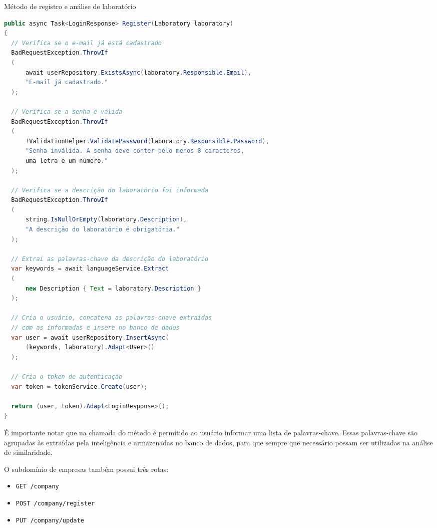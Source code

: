 \begin{sourcecode}[H]
  \caption{\label{codigo:analyze-lab}Método de registro e análise de laboratório}
  \begin{lstlisting}[frame=single, language=Java]
public async Task<LoginResponse> Register(Laboratory laboratory)
{
  // Verifica se o e-mail já está cadastrado
  BadRequestException.ThrowIf 
  (
      await userRepository.ExistsAsync(laboratory.Responsible.Email), 
      "E-mail já cadastrado."
  );

  // Verifica se a senha é válida
  BadRequestException.ThrowIf
  (
      !ValidationHelper.ValidatePassword(laboratory.Responsible.Password), 
      "Senha inválida. A senha deve conter pelo menos 8 caracteres, 
      uma letra e um número."
  );

  // Verifica se a descrição do laboratório foi informada
  BadRequestException.ThrowIf
  (
      string.IsNullOrEmpty(laboratory.Description), 
      "A descrição do laboratório é obrigatória."
  );

  // Extrai as palavras-chave da descrição do laboratório
  var keywords = await languageService.Extract
  (
      new Description { Text = laboratory.Description }
  );

  // Cria o usuário, concatena as palavras-chave extraídas 
  // com as informadas e insere no banco de dados
  var user = await userRepository.InsertAsync(
      (keywords, laboratory).Adapt<User>()
  );

  // Cria o token de autenticação
  var token = tokenService.Create(user);

  return (user, token).Adapt<LoginResponse>();
}
\end{lstlisting}
  \fonte{}
\end{sourcecode}

É importante notar que na chamada do método é permitido ao usuário informar uma lista de palavras-chave. Essas palavras-chave são agrupadas às extraídas pela inteligência e armazenadas no banco de dados, para que sempre que necessário possam ser utilizadas na análise de similaridade.

O subdomínio de empresas também possui três rotas:

\begin{itemize}
  \item \texttt{GET /company}
  \item \texttt{POST /company/register}
  \item \texttt{PUT /company/update}
\end{itemize}

